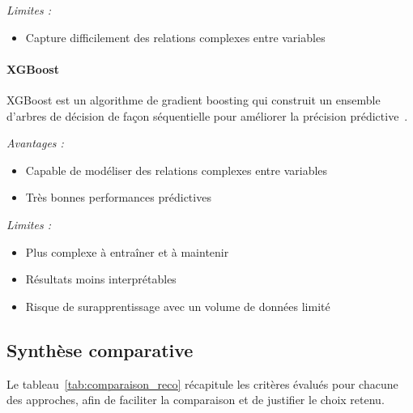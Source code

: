 \textit{Limites :}
\begin{itemize}
  \item Capture difficilement des relations complexes entre variables
\end{itemize}

\paragraph{XGBoost}

XGBoost est un algorithme de gradient boosting qui construit un ensemble
d'arbres de décision de façon séquentielle pour améliorer la précision
prédictive~\cite{ChenGuestrin2016}.

\textit{Avantages :}
\begin{itemize}
  \item Capable de modéliser des relations complexes entre variables
  \item Très bonnes performances prédictives
\end{itemize}

\textit{Limites :}
\begin{itemize}
  \item Plus complexe à entraîner et à maintenir
  \item Résultats moins interprétables
  \item Risque de surapprentissage avec un volume de données limité
\end{itemize}

\subsection{Synthèse comparative}

Le tableau~\ref{tab:comparaison_reco} récapitule les critères évalués pour chacune des
approches, afin de faciliter la comparaison et de justifier le choix retenu.

